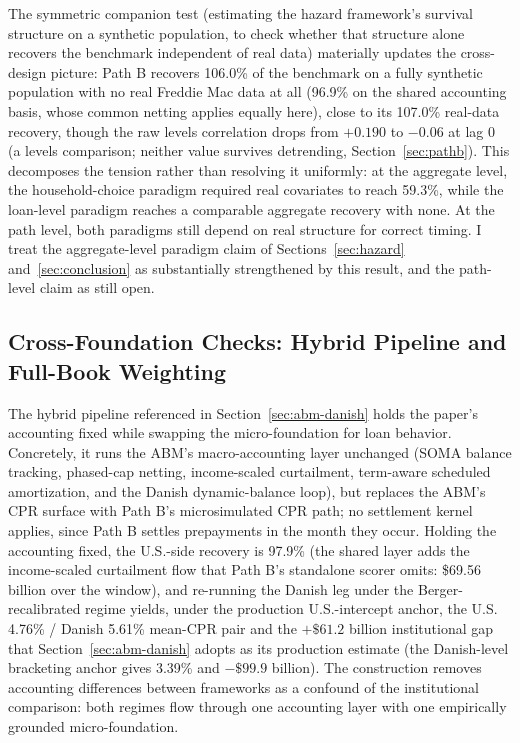 \documentclass[12pt]{article}
\begin{document}
The symmetric companion test (estimating the hazard framework's survival structure on a synthetic population, to check whether that structure alone recovers the benchmark independent of real data) materially updates the cross-design picture: Path B recovers 106.0\% of the benchmark on a fully synthetic population with no real Freddie Mac data at all (96.9\% on the shared accounting basis, whose common netting applies equally here), close to its 107.0\% real-data recovery, though the raw levels correlation drops from $+0.190$ to $-0.06$ at lag 0 (a levels comparison; neither value survives detrending, Section~\ref{sec:pathb}). This decomposes the tension rather than resolving it uniformly: at the aggregate level, the household-choice paradigm required real covariates to reach 59.3\%, while the loan-level paradigm reaches a comparable aggregate recovery with none. At the path level, both paradigms still depend on real structure for correct timing. I treat the aggregate-level paradigm claim of Sections~\ref{sec:hazard} and~\ref{sec:conclusion} as substantially strengthened by this result, and the path-level claim as still open.

\subsection{Cross-Foundation Checks: Hybrid Pipeline and Full-Book Weighting}\label{sec:robustness-hybrid}

The hybrid pipeline referenced in Section~\ref{sec:abm-danish} holds the paper's accounting fixed while swapping the micro-foundation for loan behavior. Concretely, it runs the ABM's macro-accounting layer unchanged (SOMA balance tracking, phased-cap netting, income-scaled curtailment, term-aware scheduled amortization, and the Danish dynamic-balance loop), but replaces the ABM's CPR surface with Path B's microsimulated CPR path; no settlement kernel applies, since Path B settles prepayments in the month they occur. Holding the accounting fixed, the U.S.-side recovery is 97.9\% (the shared layer adds the income-scaled curtailment flow that Path B's standalone scorer omits: \$69.56 billion over the window), and re-running the Danish leg under the Berger-recalibrated regime yields, under the production U.S.-intercept anchor, the U.S. 4.76\% / Danish 5.61\% mean-CPR pair and the $+\$61.2$ billion institutional gap that Section~\ref{sec:abm-danish} adopts as its production estimate (the Danish-level bracketing anchor gives 3.39\% and $-\$99.9$ billion). The construction removes accounting differences between frameworks as a confound of the institutional comparison: both regimes flow through one accounting layer with one empirically grounded micro-foundation.
\end{document}
